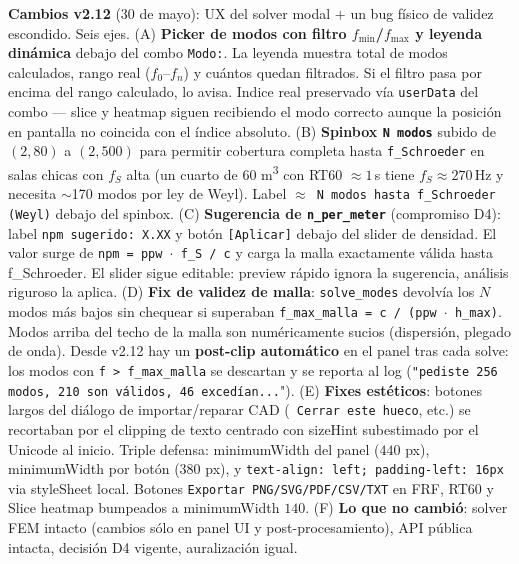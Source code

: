 \documentclass[11pt, a4paper]{article}
\begin{document}
\begin{center}
{    \textbf{Cambios v2.12} (30 de mayo): UX del solver modal $+$ un bug
    físico de validez escondido. Seis ejes.
    (A) \textbf{Picker de modos con filtro $f_\text{min}$/$f_\text{max}$ y
    leyenda dinámica} debajo del combo \texttt{Modo:}. La leyenda muestra
    total de modos calculados, rango real ($f_0$--$f_n$) y cuántos quedan
    filtrados. Si el filtro pasa por encima del rango calculado, lo avisa.
    Indice real preservado vía \texttt{userData} del combo --- slice y
    heatmap siguen recibiendo el modo correcto aunque la posición en
    pantalla no coincida con el índice absoluto.
    (B) \textbf{Spinbox \texttt{N\textordmasculine{} modos}} subido de $(2, 80)$ a $(2, 500)$
    para permitir cobertura completa hasta \texttt{f\_Schroeder} en salas
    chicas con $f_S$ alta (un cuarto de 60 m\textsuperscript{3} con
    RT60 $\approx 1$\,s tiene $f_S \approx 270$\,Hz y necesita
    $\sim$170 modos por ley de Weyl). Label \texttt{$\approx$ N modos
    hasta f\_Schroeder (Weyl)} debajo del spinbox.
    (C) \textbf{Sugerencia de \texttt{n\_per\_meter}} (compromiso D4): label
    \texttt{npm sugerido: X.XX} y botón \texttt{[Aplicar]} debajo del
    slider de densidad. El valor surge de \texttt{npm = ppw $\cdot$ f\_S
    / c} y carga la malla exactamente válida hasta f\_Schroeder. El
    slider sigue editable: preview rápido ignora la sugerencia, análisis
    riguroso la aplica.
    (D) \textbf{Fix de validez de malla}: \texttt{solve\_modes} devolvía
    los $N$ modos más bajos sin chequear si superaban
    \texttt{f\_max\_malla = c / (ppw $\cdot$ h\_max)}. Modos arriba del
    techo de la malla son numéricamente sucios (dispersión, plegado de
    onda). Desde v2.12 hay un \textbf{post-clip automático} en el panel
    tras cada solve: los modos con \texttt{f > f\_max\_malla} se
    descartan y se reporta al log
    (\texttt{"pediste 256 modos, 210 son válidos, 46 excedían...}").
    (E) \textbf{Fixes estéticos}: botones largos del diálogo de
    importar/reparar CAD (\texttt{\checkmark{} Cerrar este hueco}, etc.) se
    recortaban por el clipping de texto centrado con sizeHint
    subestimado por el Unicode al inicio. Triple defensa: minimumWidth
    del panel ($440$ px), minimumWidth por botón ($380$ px), y
    \texttt{text-align:\ left; padding-left:\ 16px} via styleSheet
    local. Botones \texttt{Exportar PNG/SVG/PDF/CSV/TXT} en FRF, RT60 y
    Slice heatmap bumpeados a minimumWidth $140$.
    (F) \textbf{Lo que no cambió}: solver FEM intacto (cambios sólo en
    panel UI y post-procesamiento), API pública intacta, decisión D4
    vigente, auralización igual.\\[2pt]
}
\end{center}
\end{document}

